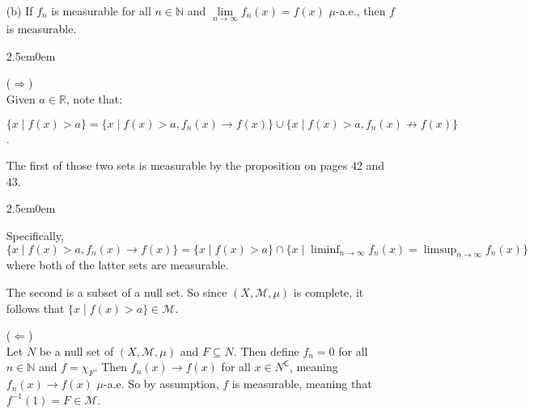 \documentclass{book}
\newcommand{\exTwoP}{%
   \color{RedViolet}%
   \fontsize{13}{15}\selectfont%
}
\newcommand{\exPP}{%
   \color{RedViolet}%
   \fontsize{12}{14}\selectfont%
}
\newenvironment{myIndent}{%
   \begin{adjustwidth}{2.5em}{0em}%
}{%
   \end{adjustwidth}%
}
\newcommand{\comp}{\mathsf{C}}
\newcommand{\retTwo}{\hfill\bigbreak}
\begin{document}
\begin{enumerate}
   \item[(b)] If $f_n$ is measurable for all $n \in \mathbb{N}$ and $\lim\limits_{n \rightarrow \infty}f_n(x) = f(x)$ $\mu$-a.e., then $f$ is measurable.
   
   \begin{myIndent}\exTwoP
      ($\Longrightarrow$)\\
      Given $a \in \mathbb{R}$, note that:
      
      {\centering\exPP $\{x \mid f(x) > a\} = \{x \mid f(x) > a, f_n(x) \rightarrow f(x)\} \cup \{x \mid f(x) > a, f_n(x) \not\rightarrow f(x)\}$.\newpage\par}

      The first of those two sets is measurable by the proposition on pages 42 and 43. 
		\begin{myIndent}\exTwoP
			Specifically, $\{x \mid f(x) > a, f_n(x) \rightarrow f(x)\} = \{x \mid f(x) > a\} \cap \{x \mid \liminf_{n \to \infty}f_n(x) = \limsup_{n \to \infty} f_n(x)\}$ where both of the latter sets are measurable.\retTwo
		\end{myIndent}
		
		The second is a subset of a null set. So since $(X, \mathcal{M}, \mu)$ is complete, it follows that $\{x \mid f(x) > a\} \in \mathcal{M}$.\retTwo

      ($\Longleftarrow$)\\
      Let $N$ be a null set of $(X, \mathcal{M}, \mu)$ and $F \subseteq N$. Then define $f_n = 0$ for all $n \in \mathbb{N}$ and $f = \chi_F$. Then $f_n(x) \rightarrow f(x)$ for all $x \in N^\comp$, meaning $f_n(x) \rightarrow f(x)$ $\mu$-a.e. So by assumption, $f$ is measurable, meaning that $f^{-1}(1) = F \in \mathcal{M}$. 
      \retTwo
   \end{myIndent}
\end{enumerate}
\end{document}
